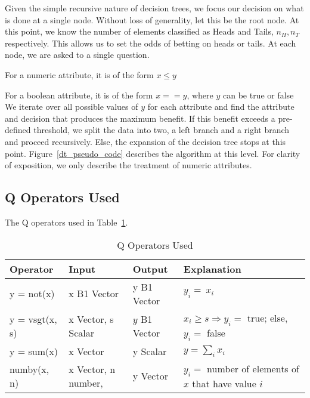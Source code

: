 Given the simple recursive nature of decision trees, we focus our 
decision on what is done at a single node. Without loss of generality, 
let this be the root node. At this point, we know the number of elements
classified as Heads and Tails, \(n_H, n_T\) respectively. This allows us to set
the odds of betting on heads or tails. At each node, we are asked to a single
question. 
\bi
\item For a numeric attribute, it is of the form \(x \leq y\)
\item For a boolean attribute, it is of the form \(x == y\), where 
\(y\) can be true or false
\ei
We iterate over all possible values of \(y\) for each attribute and find the
attribute and decision that produces the maximum benefit. If this benefit
exceeds a pre-defined threshold, we split the data into two, a left branch and a
right branch and proceed recursively. Else, the expansion of the decision tree
stops at this point.
Figure~\ref{dt_pseudo_code} describes the algorithm at this level. For clarity of 
exposition, we only describe the treatment of numeric attributes.


\subsection{Q Operators Used}
The Q operators used in Table~\ref{tbl_q_op}.
\begin{table}
\centering
\begin{tabular}{|l|l|l|l|} \hline \hline
{\bf Operator} & {\bf Input} & {\bf Output} & {\bf Explanation} \\ \hline \hline
y = not(x) & x B1 Vector & y B1 Vector & \(y_i = ~x_i\) \\ \hline
y = vsgt(x, s) & x Vector, s Scalar & \(y\) B1 Vector & 
\(x_i \geq s \Rightarrow y_i = \) true; else, \(y_i = \)  false \\ \hline
y = sum(x) & x Vector & y Scalar & \(y = \sum_i x_i\)  \\ \hline
numby(x, n) & x Vector, n number, 
&
y Vector & \(y_i = \) number of elements of \(x\) that have value \(i\) \\ \hline
\hline
\end{tabular}
\caption{Q Operators Used}
\label{tbl_q_op}
\end{table}

